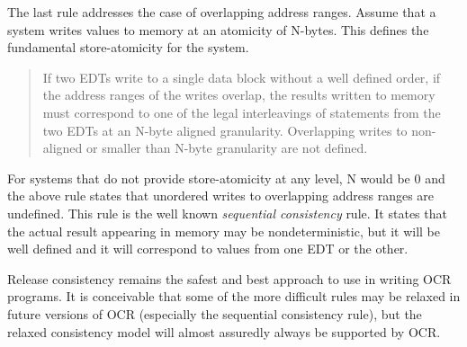 The last rule addresses the case of overlapping address ranges. Assume that
a system writes values to memory at an atomicity of N-bytes. This defines
the fundamental store-atomicity for the system.
\begin{quote}
If two EDTs write to a single data block without a well defined order,
if the address ranges of the writes overlap, the results written to
memory must correspond to one of the legal interleavings of statements
from the two EDTs at an N-byte aligned granularity. Overlapping writes
to non-aligned or smaller than N-byte granularity are not defined.
\end{quote}
For systems that do not provide store-atomicity at any level, N would be 0
and the above rule states that unordered writes to overlapping address
ranges are undefined.
This rule is the well known \emph{sequential consistency} rule. It states that the actual result appearing in
memory may be nondeterministic, but it will be well defined and it
will correspond to values from one EDT or the other.

Release consistency remains the safest and best approach to use in
writing OCR programs. It is conceivable that some of the more
difficult rules may be relaxed in future versions of OCR (especially
the sequential consistency rule), but the relaxed consistency model
will almost assuredly always be supported by OCR.

